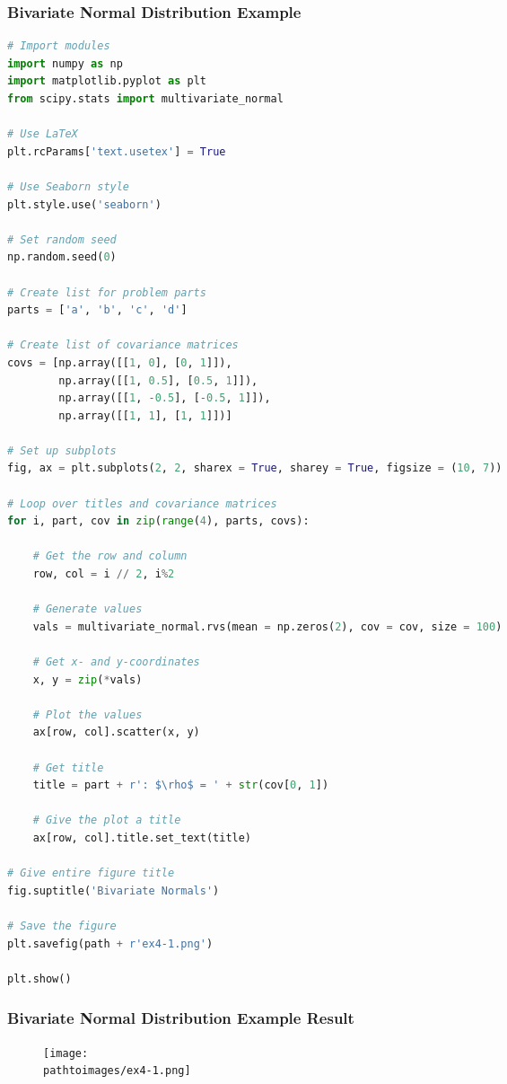 \documentclass{beamer}
\newcommand{\pathtoimages}{/Users/charlesrambo/Desktop/Bootcamp24/Images}
\begin{document}
\begin{frame}[fragile]
\frametitle{Bivariate Normal Distribution Example}
\begin{multicols}{2}
\begin{lstlisting}[language=Python]
# Import modules
import numpy as np
import matplotlib.pyplot as plt
from scipy.stats import multivariate_normal

# Use LaTeX
plt.rcParams['text.usetex'] = True

# Use Seaborn style
plt.style.use('seaborn')

# Set random seed
np.random.seed(0)

# Create list for problem parts
parts = ['a', 'b', 'c', 'd']

# Create list of covariance matrices
covs = [np.array([[1, 0], [0, 1]]), 
        np.array([[1, 0.5], [0.5, 1]]), 
        np.array([[1, -0.5], [-0.5, 1]]), 
        np.array([[1, 1], [1, 1]])]

# Set up subplots
fig, ax = plt.subplots(2, 2, sharex = True, sharey = True, figsize = (10, 7))

# Loop over titles and covariance matrices 
for i, part, cov in zip(range(4), parts, covs):
    
    # Get the row and column
    row, col = i // 2, i%2

    # Generate values
    vals = multivariate_normal.rvs(mean = np.zeros(2), cov = cov, size = 100)
    
    # Get x- and y-coordinates
    x, y = zip(*vals)
    
    # Plot the values
    ax[row, col].scatter(x, y)
    
    # Get title
    title = part + r': $\rho$ = ' + str(cov[0, 1])
    
    # Give the plot a title
    ax[row, col].title.set_text(title)

# Give entire figure title
fig.suptitle('Bivariate Normals')

# Save the figure
plt.savefig(path + r'ex4-1.png')

plt.show()
\end{lstlisting}
\end{multicols}
\end{frame}

\begin{frame}
\frametitle{Bivariate Normal Distribution Example Result}
\begin{figure}
\centering
\texttt{[image: \\pathtoimages/ex4-1.png]}
\end{figure}
\end{frame}
\end{document}

